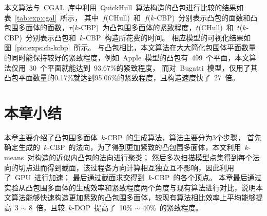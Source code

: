 \clearpage
本文算法与~CGAL~库中利用~QuickHull~算法构造的凸包进行比较的结果如表~\ref{tab:exp:cgal}~所示，
其中~$f$(CHull)~和~$f$($k$-CBP)~分别表示凸包的面数和凸包围多面体的面数，$\tau$($k$-CBP)~为凸包围多面体的紧致程度，$t$(CHull)~和~$t$($k$-CBP)~分别表示凸包和~$k$-CBP~构造所花费的时间。
相应模型的可视化结果如图~\ref{pic:exps:ch-kcbp}~所示。
与凸包相比，本文算法在大大简化包围体平面数量的同时能保持较好的紧致程度，例如~Apple~模型的凸包有~499~个平面，本文算法仅用~30~个平面就能达到~93.67\%的紧致程度，
而对~Bugatti~模型，仅用了其凸包平面数量的0.17\%就达到95.06\%的紧致程度，且构造速度快了~27~倍。

\FloatBarrier
\section{本章小结}
\label{sec:chap02:summary}

本章主要介绍了凸包围多面体~$k$-CBP~的生成算法，算法主要分为3个步骤，
首先确定生成的~$k$-CBP~的法向，为了得到更加紧致的凸包围多面体，本文利用~$k$-means~对构造的近似内凸包的法向进行聚类；
然后多次扫描模型点集得到每个法向的切点进而得到截面，该过程各方向计算相互独立互不影响，因此利用了~GPU~进行加速；
最后通过截面求交得到~$k$-CBP~的各个顶点。
本章最后通过实验从凸包围多面体的生成效率和紧致程度两个角度与现有算法进行对比，说明本文算法能够快速构造更加紧致的凸包围多面体，较现有算法相比效率上平均能够提高~3 $\sim$ 8~倍，且较~$k$-DOP~提高了~10\% $\sim$ 40\%~的紧致程度。

